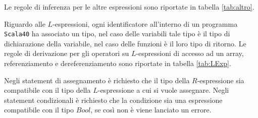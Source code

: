 Le regole di inferenza per le altre espressioni sono riportate in tabella \ref{tab:altro}.

\begin{table}[]

\caption{Regole di derivazione per l'operatore di creazione di array e l'operatore condizionale.}
\label{tab:altro}
\end{table}

Riguardo alle $L$-espressioni, ogni identificatore all'interno di un programma \texttt{Scala40} ha associato un tipo, nel caso delle variabili tale tipo è il tipo di dichiarazione della variabile, nel caso delle funzioni è il loro tipo di ritorno. Le regole di derivazione per gli operatori su $L$-espressioni di accesso ad un array, referenziamento e dereferenziamento sono riportate in tabella \ref{tab:LExp}.

\begin{table}[]
\caption{Regole di derivazione per gli operatori su $L$-espressioni.}
\label{tab:LExp}
\end{table}

Negli statement di assegnamento è richiesto che il tipo della $R$-espressione sia compatibile con il tipo della $L$-espressione a cui si vuole assegnare.
Negli statement condizionali è richiesto che la condizione sia una espressione compatibile con il tipo $Bool$, se così non è viene lanciato un errore.

